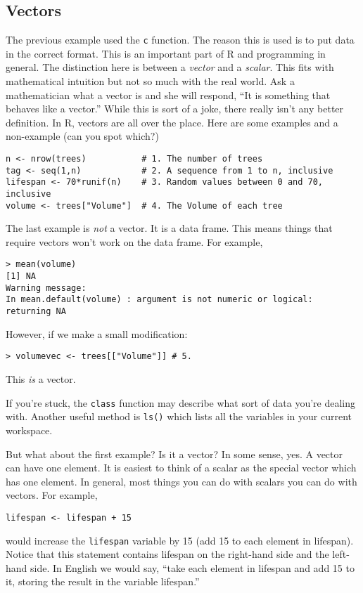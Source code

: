 \documentclass[12pt]{article}
\begin{document}
\subsection{Vectors}
The previous example used the \verb|c| function. The reason this is used is to put data in the correct format. This is an important part of R and programming in general. The distinction here is between a \emph{vector} and a \emph{scalar}. This fits with mathematical intuition but not so much with the real world. Ask a mathematician what a vector is and she will respond, ``It is something that behaves like a vector.'' While this is sort of a joke, there really isn't any better definition. In R, vectors are all over the place. Here are some examples and a non-example (can you spot which?)
\begin{verbatim}
n <- nrow(trees)           # 1. The number of trees
tag <- seq(1,n)            # 2. A sequence from 1 to n, inclusive
lifespan <- 70*runif(n)    # 3. Random values between 0 and 70, inclusive
volume <- trees["Volume"]  # 4. The Volume of each tree
\end{verbatim}

The last example is \emph{not} a vector. It is a data frame. This means things that require vectors won't work on the data frame. For example,
\begin{verbatim}
> mean(volume)
[1] NA
Warning message:
In mean.default(volume) : argument is not numeric or logical: returning NA
\end{verbatim}
However, if we make a small modification:
\begin{verbatim}
> volumevec <- trees[["Volume"]] # 5.
\end{verbatim}
This \emph{is} a vector.

If you're stuck, the \verb|class| function may describe what sort of data you're dealing with. Another useful method is \verb|ls()| which lists all the variables in your current workspace.

But what about the first example? Is it a vector? In some sense, yes. A vector can have one element. It is easiest to think of a scalar as the special vector which has one element. In general, most things you can do with scalars you can do with vectors. For example,
\begin{verbatim}
lifespan <- lifespan + 15
\end{verbatim}
would increase the \verb|lifespan| variable by 15 (add 15 to each element in lifespan). Notice that this statement contains lifespan on the right-hand side and the left-hand side. In English we would say, ``take each element in lifespan and add 15 to it, storing the result in the variable lifespan.''\
\end{document}
